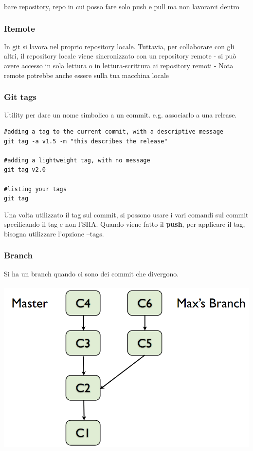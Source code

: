 \documentclass[10pt,a4paper]{book}
\begin{document}
bare repository, repo in cui posso fare solo push e pull ma non lavorarci dentro

\subsubsection{Remote}
In git si lavora nel proprio repository locale. Tuttavia, per collaborare con gli altri, il repository locale viene sincronizzato con un repository remote
- si può avere accesso in sola lettura o in lettura-scrittura ai repository remoti
- Nota remote potrebbe anche essere sulla tua macchina locale

\subsubsection{Git tags}
Utility per dare un nome simbolico a un commit. e.g. associarlo a una release.
\begin{verbatim}
#adding a tag to the current commit, with a descriptive message 
git tag -a v1.5 -m "this describes the release"

#adding a lightweight tag, with no message 
git tag v2.0 

#listing your tags 
git tag
\end{verbatim}

Una volta utilizzato il tag sul commit, si possono usare i vari comandi sul commit specificando il tag e non l'SHA.
Quando viene fatto il \textbf{push}, per applicare il tag, bisogna utilizzare l'opzione --tags.

\subsubsection{Branch}
Si ha un branch quando ci sono dei commit che divergono.\\ \\
\includegraphics[scale=0.3]{branch2.png} \\ \\
\end{document}

